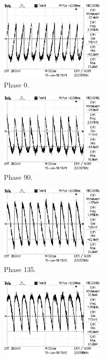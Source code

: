 \begin{figure}
  \centering
  \begin{subfigure}{0.48\textwidth}
    \centering
    \includegraphics[height=4cm]{phase0v.jpg}
    \caption{Phase 0.}
    \label{fig:phase0v}
  \end{subfigure}
  \begin{subfigure}{0.48\textwidth}
    \centering
    \includegraphics[height=4cm]{phase90v.jpg}
    \caption{Phase 90.}
    \label{fig:phase90v}
  \end{subfigure}
  \begin{subfigure}{0.48\textwidth}
    \centering
    \includegraphics[height=4cm]{phase135v.jpg}
    \caption{Phase 135.}
    \label{fig:phase135v}
  \end{subfigure}
  \begin{subfigure}{0.48\textwidth}
    \centering
    \includegraphics[height=4cm]{phase180v.jpg}

\end{subfigure}
\end{figure}
